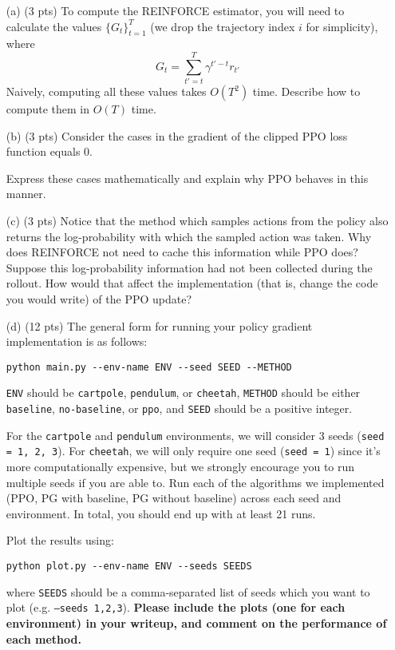 \documentclass{article}
\begin{document}
\begin{enumerate}
\item[(a) (3 pts)] To compute the REINFORCE estimator, you will need to calculate the values $\{G_t\}_{t=1}^{T}$ (we drop the trajectory index $i$ for simplicity), where
$$
G_t = \sum_{t'=t}^{T} \gamma^{t'-t} r_{t'}
$$
Naively, computing all these values takes $O(T^2)$ time. Describe how to compute them in $O(T)$ time.

\item[(b) (3 pts)] Consider the cases in the gradient of the clipped PPO loss function equals 0. 

Express these cases mathematically and explain why PPO behaves in this manner.

\item[(c) (3 pts)] Notice that the method which samples actions from the policy also returns the log-probability with which the sampled action was taken. Why does REINFORCE not need to cache this information while PPO does? Suppose this log-probability information had not been collected during the rollout. How would that affect the implementation (that is, change the code you would write) of the PPO update? 

\item[(d) (12 pts)] The general form for running your policy gradient implementation is as follows:
\begin{tcolorbox}
\begin{verbatim}
python main.py --env-name ENV --seed SEED --METHOD
\end{verbatim}
\end{tcolorbox}
\texttt{ENV} should be \texttt{cartpole}, \texttt{pendulum}, or \texttt{cheetah}, \texttt{METHOD} should be either \texttt{baseline}, \texttt{no-baseline}, or \texttt{ppo}, and \texttt{SEED} should be a positive integer.

For the \texttt{cartpole} and \texttt{pendulum} environments, we will consider 3 seeds (\texttt{seed = 1, 2, 3}). For \texttt{cheetah}, we will only require one seed (\texttt{seed = 1}) since it's more computationally expensive, but we strongly encourage you to run multiple seeds if you are able to. Run each of the algorithms we implemented (PPO, PG with baseline, PG without baseline) across each seed and environment. In total, you should end up with at least 21 runs.

Plot the results using:
\begin{tcolorbox}
\begin{verbatim}
python plot.py --env-name ENV --seeds SEEDS
\end{verbatim}
\end{tcolorbox}
where \texttt{SEEDS} should be a comma-separated list of seeds which you want to plot (e.g. \texttt{--seeds 1,2,3}).
\textbf{Please include the plots (one for each environment) in your writeup, and comment on the performance of each method.}


\end{enumerate}
\end{document}
